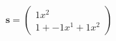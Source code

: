\documentclass[preview]{standalone}
\begin{document}
\begin{align*}
\mathbf{s} = \begin{pmatrix}1x^{2} \\ 1 + -1x^{1} + 1x^{2}\end{pmatrix}
\end{align*}
\end{document}
